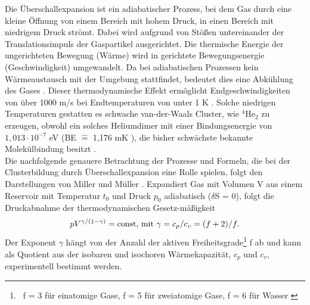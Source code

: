 Die Überschallexpansion ist ein adiabatischer Prozess, bei dem Gas durch eine kleine Öffnung von einem Bereich mit hohem Druck, in einen Bereich mit niedrigem Druck strömt. Dabei wird aufgrund von Stößen untereinander der Translationsimpuls der Gaspartikel ausgerichtet. Die thermische Energie der ungerichteten Bewegung (Wärme) wird in gerichtete Bewegungsenergie (Geschwindigkeit) umgewandelt. Da bei adiabatischen Prozessen kein Wärmeaustausch mit der Umgebung stattfindet, bedeutet dies eine Abkühlung des Gases \cite{Vielteilch92}. Dieser thermodynamische Effekt ermöglicht Endgeschwindigkeiten von über 1000 m/s bei Endtemperaturen von unter 1 K \cite{mueller12}. 
Solche niedrigen Temperaturen gestatten es schwache van-der-Waals Cluster, wie  $\mathrm{^4}\mathrm{He}_2$ zu erzeugen, obwohl ein solches Heliumdimer mit einer Bindungsenergie von \\ $\mathrm{1,013\cdot10^{-7}}$ eV (BE $\widehat{=}$ 1,176 mK \cite{Lohr2007}), die bisher schwächste bekannte Molekülbindung besitzt \cite{Luo1993}. \\
Die nachfolgende genauere Betrachtung der Prozesse und Formeln, die bei der Clusterbildung durch Überschallexpansion eine Rolle spielen, folgt den Darstellungen von Miller \cite{scoles1988} und Müller \cite{mul13}.
\clearpage
%
Expandiert Gas mit Volumen V aus einem Reservoir mit Temperatur $t_0$ und Druck $p_0$ adiabatisch ($\delta$S = 0), folgt die Druckabnahme der thermodynamischen Gesetz-mäßigkeit
\begin{equation}
pV^{\gamma/(1-\gamma)} = \textmd{const, mit}\ \gamma=c_p/c_v=(f+2)/f .
\end{equation}
%
Der Exponent $\gamma$ hängt von der Anzahl der aktiven Freiheitsgrade\footnote{\ f = 3 für einatomige Gase, f = 5 für zweiatomige Gase, f = 6 für Wasser \cite{mul13}} f ab und kann als Quotient aus der isobaren und isochoren Wärmekapazität, $c_p$ und $c_v$, experimentell bestimmt werden. 

